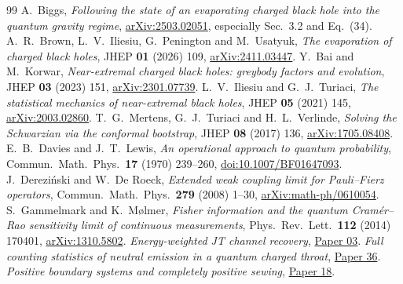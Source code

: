 \documentclass[11pt]{article}
\begin{document}
\begin{thebibliography}{99}
 A.~Biggs, \emph{Following the state of an evaporating charged black hole into the quantum gravity regime}, \href{https://arxiv.org/abs/2503.02051}{arXiv:2503.02051}, especially Sec.~3.2 and Eq.~(34).
 A.~R.~Brown, L.~V.~Iliesiu, G.~Penington and M.~Usatyuk, \emph{The evaporation of charged black holes}, JHEP \textbf{01} (2026) 109, \href{https://arxiv.org/abs/2411.03447}{arXiv:2411.03447}.
 Y.~Bai and M.~Korwar, \emph{Near-extremal charged black holes: greybody factors and evolution}, JHEP \textbf{03} (2023) 151, \href{https://arxiv.org/abs/2301.07739}{arXiv:2301.07739}.
 L.~V.~Iliesiu and G.~J.~Turiaci, \emph{The statistical mechanics of near-extremal black holes}, JHEP \textbf{05} (2021) 145, \href{https://arxiv.org/abs/2003.02860}{arXiv:2003.02860}.
 T.~G.~Mertens, G.~J.~Turiaci and H.~L.~Verlinde, \emph{Solving the Schwarzian via the conformal bootstrap}, JHEP \textbf{08} (2017) 136, \href{https://arxiv.org/abs/1705.08408}{arXiv:1705.08408}.
 E.~B.~Davies and J.~T.~Lewis, \emph{An operational approach to quantum probability}, Commun.\ Math.\ Phys.\ \textbf{17} (1970) 239--260, \href{https://doi.org/10.1007/BF01647093}{doi:10.1007/BF01647093}.
 J.~Derezi\'nski and W.~De Roeck, \emph{Extended weak coupling limit for Pauli--Fierz operators}, Commun.\ Math.\ Phys.\ \textbf{279} (2008) 1--30, \href{https://arxiv.org/abs/math-ph/0610054}{arXiv:math-ph/0610054}.
 S.~Gammelmark and K.~M{\o}lmer, \emph{Fisher information and the quantum Cram\'er--Rao sensitivity limit of continuous measurements}, Phys.\ Rev.\ Lett.\ \textbf{112} (2014) 170401, \href{https://arxiv.org/abs/1310.5802}{arXiv:1310.5802}.
 \emph{Energy-weighted JT channel recovery}, \href{https://github.com/g3173028019-beep/ai-automated-quantum-gravity-research/tree/main/papers/03-jt-energy-weighted-recovery}{Paper 03}.
 \emph{Full counting statistics of neutral emission in a quantum charged throat}, \href{https://github.com/g3173028019-beep/ai-automated-quantum-gravity-research/tree/main/papers/36-charged-throat-emission}{Paper 36}.
 \emph{Positive boundary systems and completely positive sewing}, \href{https://github.com/g3173028019-beep/ai-automated-quantum-gravity-research/tree/main/papers/18-positive-boundary-sewing}{Paper 18}.
\end{thebibliography}
\end{document}
